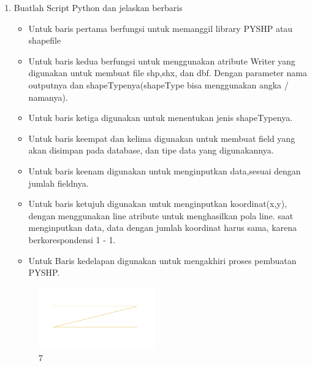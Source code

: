 \begin{enumerate}
	\item Buatlah Script Python dan jelaskan berbaris
	
	\begin{itemize}
		\item Untuk baris pertama berfungsi untuk memanggil library PYSHP atau shapefile
		\item Untuk baris kedua berfungsi untuk menggunakan atribute Writer yang digunakan untuk membuat file shp,shx, dan dbf. \hfill\break Dengan parameter nama outputnya dan shapeTypenya(shapeType bisa menggunakan angka / namanya).
		\item Untuk baris ketiga digunakan untuk menentukan jenis shapeTypenya.
		\item Untuk baris keempat dan kelima digunakan untuk membuat field yang akan disimpan pada database, dan tipe data yang digunakannya.
		\item Untuk baris keenam digunakan untuk menginputkan data,sesuai dengan jumlah fieldnya.
		\item Untuk baris ketujuh digunakan untuk menginputkan koordinat(x,y), dengan menggunakan line atribute untuk menghasilkan pola line. \hfill\break
		saat menginputkan data, data dengan jumlah koordinat harus sama, karena berkorespondensi 1 - 1.
		\item Untuk Baris kedelapan digunakan untuk mengakhiri proses pembuatan PYSHP.
	\end{itemize}
	\hfill\break
	\begin{figure}[H]
		\includegraphics[width=5cm]{figures/1174009/2/7.png}
		\centering
		\caption{ 7}
	\end{figure}


\end{enumerate}
